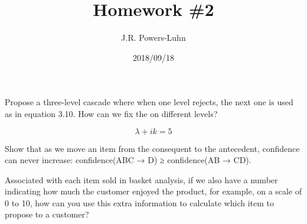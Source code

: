 \documentclass{hw}
\author{J.R. Powers-Luhn}
\date{2018/09/18}
\title{Homework \#2}
\begin{document}

    Propose a three-level cascade where when one level rejects, the next one is used as in equation 3.10. How can we fix the \lambda on different levels? 

    \begin{equation}
        \lambda+{ik} = 5
    \end{equation}

\solution
    

    Show that as we move an item from the consequent to the antecedent, confidence can never increase: confidence(ABC → D) ≥ confidence(AB → CD).

\solution
    

    Associated with each item sold in basket analysis, if we also have a number indicating how much the customer enjoyed the product, for example, on a scale of 0 to 10, how can you use this extra information to calculate which item to propose to a customer?

\solution
    
\end{document}
